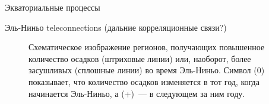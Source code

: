 \begin{chapter}{Экваториальные процессы}
\begin{section}{Эль-Ниньо teleconnections (дальние корреляционные связи?)}
\begin{figure}[t!]
\caption{Схематическое изображение регионов, получающих повышенное количество 
осадков (штриховые линии) или, наоборот, более засушливых (сплошные линии) во
время Эль-Ниньо. Символ (0) показывает, что количество осадков
изменяется в тот год, когда начинается Эль-Ниньо, а (+)~--- в следующем за 
ним году.~\cite{Ropelewski:1987}}
\label{fig:teleconnections}
\end{figure}
%


\end{section}
\end{chapter}
